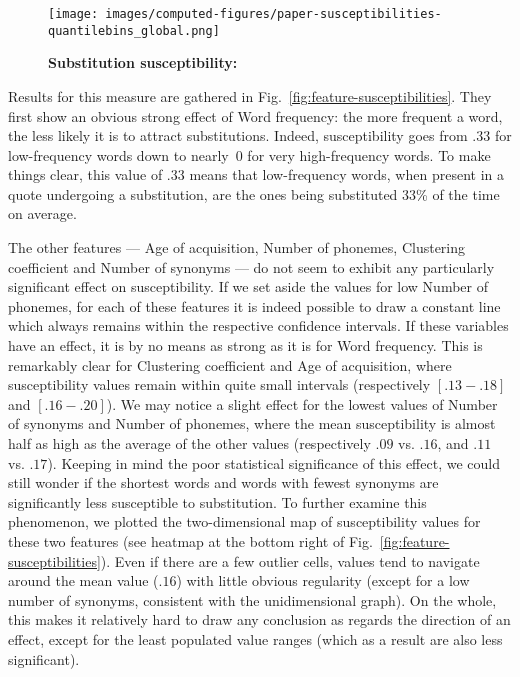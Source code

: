 \begin{figure*}[!th]
    \centering
    \texttt{[image: images/computed-figures/paper-susceptibilities-quantilebins\_global.png]}
    \caption{\textbf{Substitution susceptibility:}%
    }
    \label{fig:feature-susceptibilities-global}
\end{figure*}

\medskip



Results for this measure are gathered in Fig.~\ref{fig:feature-susceptibilities}. They first show an obvious strong effect of Word frequency: the more frequent a word, the less likely it is to attract substitutions.
Indeed, susceptibility goes from $.33$ for low-frequency words down to nearly~0 for very high-frequency words.
To make things clear, this value of $.33$ means that low-frequency words, when present in a quote undergoing a substitution, are the ones being substituted 33\% of the time on average.

The other features --- Age of acquisition, Number of phonemes, Clustering coefficient and Number of synonyms --- do not seem to exhibit any particularly significant effect on susceptibility.
{If we set aside the values for low Number of phonemes}, for each of these features it is indeed possible to draw a constant line which always remains within the respective confidence intervals.
If these variables have an effect, it is by no means as strong as it is for Word frequency.
This is remarkably clear for Clustering coefficient and Age of acquisition, where susceptibility values remain within quite small intervals (respectively $[.13-.18]$ and $[.16-.20]$).
{We may notice a slight effect for the lowest values of Number of synonyms and Number of phonemes, where the mean susceptibility is almost half as high as the average of the other values (respectively $.09$ vs. $.16$, and $.11$ vs. $.17$).}
Keeping in mind the poor statistical significance of this effect, we could still wonder if the shortest words and words with fewest synonyms are significantly less susceptible to substitution.
To further examine this phenomenon, we plotted the two-dimensional map of susceptibility values for these two features (see heatmap at the bottom right of Fig.~\ref{fig:feature-susceptibilities}).
{Even if there are a few outlier cells, values tend to navigate around the mean value ($.16$) with little obvious regularity (except for a low number of synonyms, consistent with the unidimensional graph)}. {On the whole, this makes it relatively hard to draw any conclusion as regards the direction of an effect, except for the least populated value ranges (which as a result are also less significant).}

